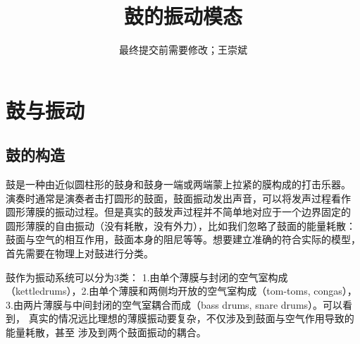 \documentclass[a4paper]{ctexart}
\title{\textbf{鼓的振动模态}}
\author{最终提交前需要修改；王崇斌\;1800011716}
\date{}
\begin{document}
	\pagestyle{fancy}
	\pagestyle{fancy}
	\chead{}
	\rhead{\today}
	\maketitle
	\thispagestyle{fancy}
	\section{鼓与振动}
	\subsection{鼓的构造}
	鼓是一种由近似圆柱形的鼓身和鼓身一端或两端蒙上拉紧的膜构成的打击乐器。
	演奏时通常是演奏者击打圆形的鼓面，鼓面振动发出声音，可以将发声过程看作
	圆形薄膜的振动过程。但是真实的鼓发声过程并不简单地对应于一个边界固定的
	圆形薄膜的自由振动（没有耗散，没有外力），比如我们忽略了鼓面的能量耗散：
	鼓面与空气的相互作用，鼓面本身的阻尼等等。想要建立准确的符合实际的模型，
	首先需要在物理上对鼓进行分类。
	\par 鼓作为振动系统可以分为3类\cite{a}：
	1.由单个薄膜与封闭的空气室构成（kettledrums），2.由单个薄膜和两侧均开放的空气室构成（tom-toms, congas），
	3.由两片薄膜与中间封闭的空气室耦合而成（bass drums, snare drums）。可以看到，
	真实的情况远比理想的薄膜振动要复杂，不仅涉及到鼓面与空气作用导致的能量耗散，甚至
	涉及到两个鼓面振动的耦合。
\end{document}
